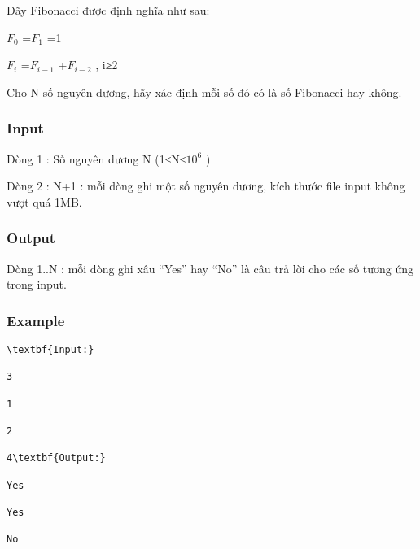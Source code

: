



   Dãy Fibonacci được định nghĩa như sau:  

   $F_{0}$   =$F_{1}$   =1  

   $F_{i}$   =$F_{i-1}$   +$F_{i-2}$   ­, i≥2  

   Cho N số nguyên dương, hãy xác định mỗi số đó có là số Fibonacci hay không.  

\subsubsection{   Input  }

   Dòng 1 : Số nguyên dương N (1≤N≤$10^{6}$   )  

   Dòng 2 : N+1 : mỗi dòng ghi một số nguyên dương, kích thước file input không vượt quá 1MB.  

\subsubsection{   Output  }

   Dòng 1..N : mỗi dòng ghi xâu “Yes” hay “No” là câu trả lời cho các số tương ứng trong input.  

\subsubsection{   Example  }
\begin{verbatim}
\textbf{Input:}

3

1

2

4\textbf{Output:}

Yes

Yes

No\end{verbatim}
